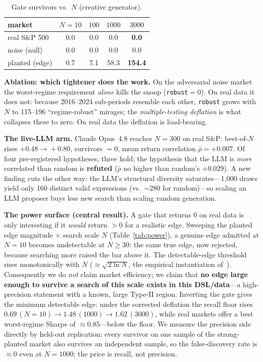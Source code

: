\documentclass[conference]{IEEEtran}
\begin{document}
\begin{table}[t]\centering
\caption{Gate survivors vs.\ $N$ (creative generator).}
\label{tab:surv}
\begin{tabular}{lcccc}
\toprule
market & $N{=}10$ & $100$ & $1000$ & $3000$\\
\midrule
real S\&P 500 & 0.0 & 0.0 & 0.0 & \textbf{0.0}\\
noise (null)  & 0.0 & 0.0 & 0.0 & 0.0\\
planted (edge)& 0.7 & 7.1 & 58.3 & \textbf{154.4}\\
\bottomrule
\end{tabular}
\end{table}

\textbf{Ablation: which tightener does the work.} On the adversarial noise market the
worst-regime requirement \emph{alone} kills the snoop (\texttt{robust}$=0$). On real data it
does not: because 2016--2024 sub-periods resemble each other, \texttt{robust} grows with $N$
to 115--196 ``regime-robust'' mirages; the \emph{multiple-testing deflation} is what collapses
these to zero. On real data the deflation is load-bearing.

\textbf{The live-LLM arm.} Claude Opus~4.8 reaches $N{=}300$ on real S\&P: best-of-$N$ rises
$+0.48\!\to\!+0.80$, survivors $=0$, mean return correlation $\bar\rho=+0.007$. Of four
pre-registered hypotheses, three hold; the hypothesis that the LLM is \emph{more} correlated
than random is \textbf{refuted} ($\bar\rho$ no higher than random's $+0.029$). A new finding
cuts the other way: the LLM's structural diversity saturates---1{,}000 draws yield only 160
distinct valid expressions (vs.\ ${\sim}280$ for random)---so scaling an LLM proposer buys
less new search than scaling random generation.

\textbf{The power surface (central result).} A gate that returns 0 on real data is only
interesting if it \emph{would} return $>0$ for a realistic edge. Sweeping the planted edge
magnitude $\times$ search scale $N$ (Table~\ref{tab:power}), a genuine edge admitted at
$N{=}10$ becomes undetectable at $N\!\ge\!30$: the same true edge, now rejected, because
searching more raised the bar above it. The detectable-edge threshold rises monotonically with
$N$ ($\approx\sqrt{2\ln N}$, the empirical instantiation of~\cite{dsr}). Consequently we do
\emph{not} claim market efficiency; we claim that \textbf{no edge large enough to survive a
search of this scale exists in this DSL/data}---a high-precision statement with a known,
large Type-II region. Inverting the gate gives the minimum detectable edge: under the
corrected deflation the recall floor rises $0.69\,(N{=}10)\!\to\!1.48\,(1000)\!\to\!1.62\,
(3000)$, while real markets offer a best worst-regime Sharpe of ${\approx}0.85$---below the
floor. We measure the precision side directly by held-out replication: every survivor on one
sample of the strong-planted market also survives an independent sample, so the
false-discovery rate is ${\approx}0$ even at $N{=}1000$; the price is recall, not precision.
\end{document}
